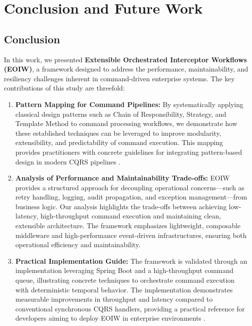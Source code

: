 \section{Conclusion and Future Work}
\subsection{Conclusion}

In this work, we presented \textbf{Extensible Orchestrated Interceptor Workflows (EOIW)}, a framework designed to address the performance, maintainability, and resiliency challenges inherent in command-driven enterprise systems. The key contributions of this study are threefold:

\begin{enumerate}
    \item \textbf{Pattern Mapping for Command Pipelines:} By systematically applying classical design patterns such as Chain of Responsibility, Strategy, and Template Method to command processing workflows, we demonstrate how these established techniques can be leveraged to improve modularity, extensibility, and predictability of command execution. This mapping provides practitioners with concrete guidelines for integrating pattern-based design in modern CQRS pipelines \cite{gamma1994design}.
    
    \item \textbf{Analysis of Performance and Maintainability Trade-offs:} EOIW provides a structured approach for decoupling operational concerns—such as retry handling, logging, audit propagation, and exception management—from business logic. Our analysis highlights the trade-offs between achieving low-latency, high-throughput command execution and maintaining clean, extensible architecture. The framework emphasizes lightweight, composable middleware and high-performance event-driven infrastructures, ensuring both operational efficiency and maintainability.
    
    \item \textbf{Practical Implementation Guide:} The framework is validated through an implementation leveraging Spring Boot and a high-throughput command queue, illustrating concrete techniques to orchestrate command execution with deterministic temporal behavior. The implementation demonstrates measurable improvements in throughput and latency compared to conventional synchronous CQRS handlers, providing a practical reference for developers aiming to deploy EOIW in enterprise environments \cite{fineract}.
\end{enumerate}

